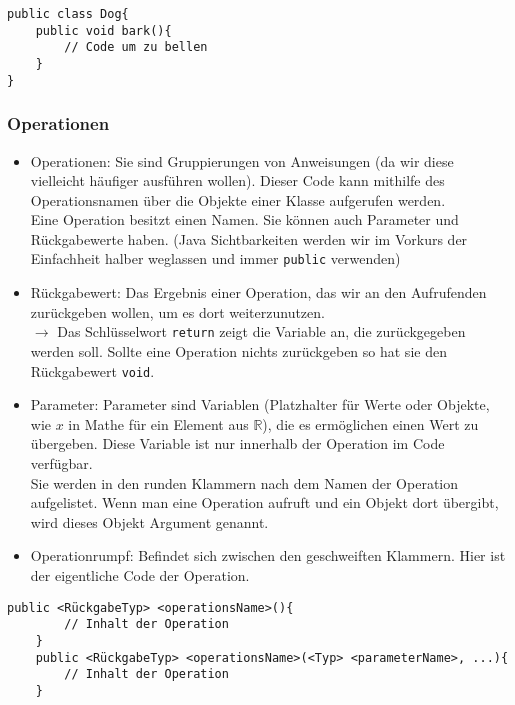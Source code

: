 \begin{lstlisting}[title=\textbf{Beispiel: Klasse}]
public class Dog{
	public void bark(){
		// Code um zu bellen
	}
}
\end{lstlisting}
\begin{Infobox}
	\subsubsection*{Operationen}
	\begin{itemize}
		\item Operationen: Sie sind Gruppierungen von Anweisungen (da wir diese vielleicht häufiger ausführen wollen).
		Dieser Code kann mithilfe des Operationsnamen über die Objekte einer Klasse aufgerufen werden.\\
		Eine Operation besitzt einen Namen. Sie können auch Parameter und Rückgabewerte haben. (Java Sichtbarkeiten werden wir im Vorkurs der Einfachheit halber weglassen und immer \lstinline{public} verwenden)
		\item Rückgabewert: Das Ergebnis einer Operation, das wir an den Aufrufenden zurückgeben wollen, um es dort weiterzunutzen.\\
		$\rightarrow$ Das Schlüsselwort \lstinline{return} zeigt die Variable an, die zurückgegeben werden soll.
		Sollte eine Operation nichts zurückgeben so hat sie den Rückgabewert \lstinline{void}.
		\item Parameter: Parameter sind Variablen (Platzhalter für Werte oder Objekte, wie $x$ in Mathe für ein Element aus $\mathbb{R}$), die es ermöglichen einen Wert zu übergeben. Diese Variable ist nur innerhalb der Operation im Code verfügbar.\\
			Sie werden in den runden Klammern nach dem Namen der Operation aufgelistet.
			Wenn man eine Operation aufruft und ein Objekt dort übergibt, wird dieses Objekt Argument genannt.
		\item Operationrumpf: Befindet sich zwischen den geschweiften Klammern. Hier ist der eigentliche Code der Operation.
	\end{itemize}

\end{Infobox}

\begin{lstlisting}[title=\textbf{Operationen Syntax}]
	public <RückgabeTyp> <operationsName>(){
		// Inhalt der Operation
	}
	public <RückgabeTyp> <operationsName>(<Typ> <parameterName>, ...){
		// Inhalt der Operation
	}
\end{lstlisting}

